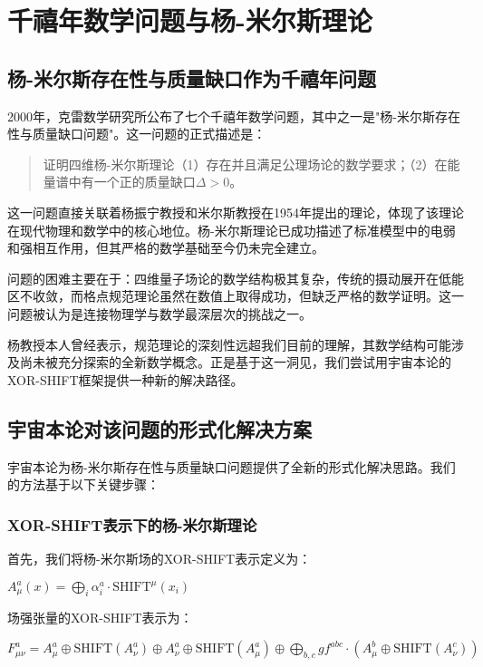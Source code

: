 \chapter{千禧年数学问题与杨-米尔斯理论}

\section{杨-米尔斯存在性与质量缺口作为千禧年问题}

2000年，克雷数学研究所公布了七个千禧年数学问题，其中之一是"杨-米尔斯存在性与质量缺口问题"。这一问题的正式描述是：

\begin{quote}
证明四维杨-米尔斯理论（1）存在并且满足公理场论的数学要求；（2）在能量谱中有一个正的质量缺口$\Delta>0$。
\end{quote}

这一问题直接关联着杨振宁教授和米尔斯教授在1954年提出的理论，体现了该理论在现代物理和数学中的核心地位。杨-米尔斯理论已成功描述了标准模型中的电弱和强相互作用，但其严格的数学基础至今仍未完全建立。

问题的困难主要在于：四维量子场论的数学结构极其复杂，传统的摄动展开在低能区不收敛，而格点规范理论虽然在数值上取得成功，但缺乏严格的数学证明。这一问题被认为是连接物理学与数学最深层次的挑战之一。

杨教授本人曾经表示，规范理论的深刻性远超我们目前的理解，其数学结构可能涉及尚未被充分探索的全新数学概念。正是基于这一洞见，我们尝试用宇宙本论的XOR-SHIFT框架提供一种新的解决路径。

\section{宇宙本论对该问题的形式化解决方案}

宇宙本论为杨-米尔斯存在性与质量缺口问题提供了全新的形式化解决思路。我们的方法基于以下关键步骤：

\subsection{XOR-SHIFT表示下的杨-米尔斯理论}

首先，我们将杨-米尔斯场的XOR-SHIFT表示定义为：

$A_{\mu}^a(x) = \bigoplus_{i} \alpha_i^a \cdot \text{SHIFT}^{\mu}(x_i)$

场强张量的XOR-SHIFT表示为：

$F_{\mu\nu}^a = A_{\mu}^a \oplus \text{SHIFT}(A_{\nu}^a) \oplus A_{\nu}^a \oplus \text{SHIFT}(A_{\mu}^a) \oplus \bigoplus_{b,c} g f^{abc} \cdot (A_{\mu}^b \oplus \text{SHIFT}(A_{\nu}^c))$

